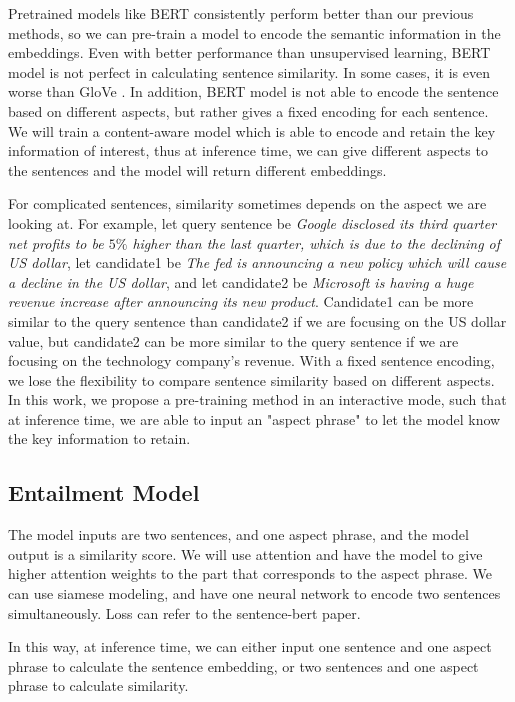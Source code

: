 \documentclass[letterpaper]{article}
\begin{document}
Pretrained models like BERT consistently perform better than our previous methods, so we can pre-train a model to encode the semantic information in the embeddings. Even with better performance than unsupervised learning, BERT model is not perfect in calculating sentence similarity. In some cases, it is even worse than GloVe \cite{sentence-BERT}. In addition, BERT model is not able to encode the sentence based on different aspects, but rather gives a fixed encoding for each sentence. We will train a content-aware model which is able to encode and retain the key information of interest, thus at inference time, we can give different aspects to the sentences and the model will return different embeddings. 

For complicated sentences, similarity sometimes depends on the aspect we are looking at. For example, let query sentence be \textit{Google disclosed its third quarter net profits to be $5\%$ higher than the last quarter, which is due to the declining of US dollar}, let candidate1 be \textit{The fed is announcing a new policy which will cause a decline in the US dollar}, and let candidate2 be \textit{Microsoft is having a huge revenue increase after announcing its new product}. Candidate1 can be more similar to the query sentence than candidate2 if we are focusing on the US dollar value, but candidate2 can be more similar to the query sentence if we are focusing on the technology company's revenue. With a fixed sentence encoding, we lose the flexibility to compare sentence similarity based on different aspects. In this work, we propose a pre-training method in an interactive mode, such that at inference time, we are able to input an "aspect phrase" to let the model know the key information to retain.

\subsection{Entailment Model}
The model inputs are two sentences, and one aspect phrase, and the model output is a similarity score. We will use attention and have the model to give higher attention weights to the part that corresponds to the aspect phrase. We can use siamese modeling, and have one neural network to encode two sentences simultaneously. Loss can refer to the sentence-bert paper.

In this way, at inference time, we can either input one sentence and one aspect phrase to calculate the sentence embedding, or two sentences and one aspect phrase to calculate similarity.
\end{document}
